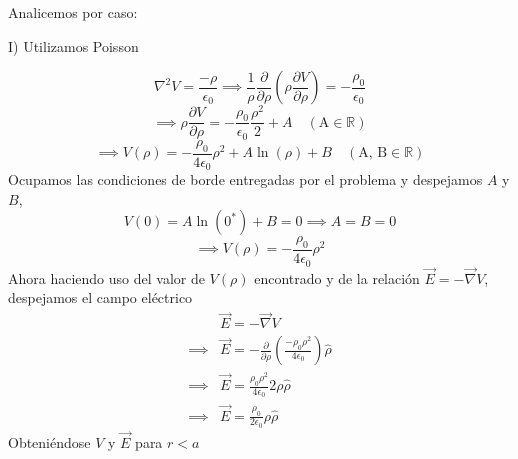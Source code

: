\begin{enumerate}[label=\alph*)]
    Analicemos por caso:
    
    I)  Utilizamos Poisson
    
    \[\nabla^2V = \frac{-\rho}{\epsilon_0} \implies \frac{1}{\rho}\frac{\partial}{\partial \rho}\left( \rho \frac{\partial V}{\partial \rho}\right) = -\frac{\rho_0}{\epsilon_0}\]
    \[\implies \rho\frac{\partial V}{\partial \rho} = -\frac{\rho_0}{\epsilon_0}\frac{\rho^2}{2} + A \quad (\text{A} \in \mathbb{R} )\]
    \[\implies V(\rho) = -\frac{\rho_0}{4\epsilon_0}\rho^2 + A\ln(\rho) + B \quad (\text{A, B} \in \mathbb{R})\]
    Ocupamos las condiciones de borde entregadas por el problema y despejamos $A$ y $B$,
    \[V(0) = A\ln(0^*) + B = 0 \implies A = B = 0\]
    \[\implies V(\rho) = -\frac{\rho_0}{4\epsilon_0}\rho^2\]
    Ahora haciendo uso del valor de $V(\rho)$ encontrado y de la relación $\vec{E} = -\vec{\nabla}V$, despejamos el campo eléctrico
    \begin{equation}
        \begin{split}
            &\vec{E} = - \vec{\nabla}V \\
            \implies &\vec{E} = - \frac{\partial}{\partial \rho}\left(\frac{-\rho_0 \rho^2}{4\epsilon_0}  \right)\hat{\rho} \\
            \implies &\vec{E} = \frac{\rho_0 \rho^2}{4\epsilon_0}2\rho\hat{\rho}\\
            \implies &\vec{E} = \frac{\rho_0}{2\epsilon_0}\rho\hat{\rho}
        \end{split}
        \nonumber
    \end{equation}
    Obteniéndose $V$ y $\vec{E}$ para $r < a$\\
    

\end{enumerate}
